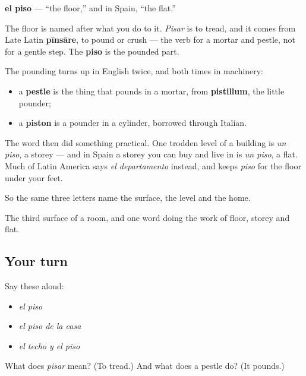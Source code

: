 \begin{cousinweb}
\textbf{el piso} — \textquotedblleft{}the floor,\textquotedblright{} and in Spain, \textquotedblleft{}the flat.\textquotedblright{}

The floor is named after what you do to it. \emph{Pisar} is to tread, and it comes from Late Latin \textbf{pīnsāre}, to pound or crush — the verb for a mortar and pestle, not for a gentle step. The \textbf{piso} is the pounded part.

The pounding turns up in English twice, and both times in machinery:

\begin{itemize}
\raggedright
  \item a \textbf{pestle} is the thing that pounds in a mortar, from \textbf{pistillum}, the little pounder;
  \item a \textbf{piston} is a pounder in a cylinder, borrowed through Italian.
\end{itemize}

The word then did something practical. One trodden level of a building is \emph{un piso}, a storey — and in Spain a storey you can buy and live in is \emph{un piso}, a flat. Much of Latin America says \emph{el departamento} instead, and keeps \emph{piso} for the floor under your feet.

So the same three letters name the surface, the level and the home.
\end{cousinweb}

\begin{grammarlens}[title={What you've built}]
The third surface of a room, and one word doing the work of floor, storey and flat.
\end{grammarlens}

\subsection*{Your turn}
Say these aloud:

\begin{itemize}
\raggedright
  \item \emph{el piso}
  \item \emph{el piso de la casa}
  \item \emph{el techo y el piso}
\end{itemize}

\begin{tcolorbox}[breakable,colback=teal!4,colframe=teal!35!black,title={Before you move on}]
What does \emph{pisar} mean? (To tread.) And what does a pestle do? (It pounds.)
\end{tcolorbox}
